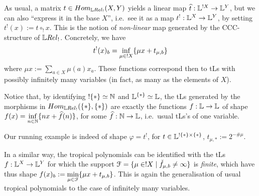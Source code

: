 
 As usual, a matrix $t\in\HOM{\LREL_!}{X}{Y}$ yields a linear map $\widehat t:\mathbb{L}^{!X}\to\mathbb{L}^Y$, but we can also ``express it in the base $X$'', i.e.\ see it as a map $t^!:\mathbb{L}^X\to\mathbb{L}^Y$, by setting $t^!(x):=t\circ_! x$.
 This is the notion of \emph{non-linear} map generated by the CCC-structure of $\LREL_!$.
 Concretely, we have
 \begin{equation}
 t^!(x)_b=\inf\limits_{\mu\in !X} \{\mu x+ t_{\mu,b}\}
 \end{equation}
 where $\mu x:=\sum\limits_{a\in X} \mu(a)x_a$.
 These functions correspond then to tLs with possibly infinitely many variables (in fact, as many as the elements of $X$). %
 
% 
%

Notice that, by identifying $!\{*\}\simeq \mathbb{N}$ and $\mathbb{L}^{\{*\}}\simeq\mathbb{L}$, the tLs generated by the morphisms in $\HOM{\LREL_!}{\set{*}}{\set{*}}$ are exactly the functions $f:\mathbb{L}\to\mathbb{L}$ of shape $f(x)=\inf\limits_{n\in\mathbb{N}}\{nx+\widehat f(n)\}$, for some $\widehat f:\mathbb{N}\to\mathbb{L}$, i.e.\ usual tLs's of one variable.
 \begin{remark}
 Our running example is indeed of shape $\varphi=t^!$, for $t\in\mathbb{L}^{!\{*\}\times\{*\}}$, $t_{\mu,*}:=2^{-\# \mu}$.
\end{remark}



 In a similar way, the tropical polynomials can be identified with the tLs
$f:\mathbb{L}^X\to\mathbb{L}^Y$ 
 for which the support $\mathcal{F}=\{\mu\in!X\mid\check f_{\mu,b}\neq\infty\}$ is \emph{finite}, which have thus shape $f(x)_b:=\min\limits_{\mu\in\mathcal{F}} \{\mu x+ t_{\mu,b}\}$.
 This is again the generalisation of usual tropical polynomials to the case of infinitely many variables.

